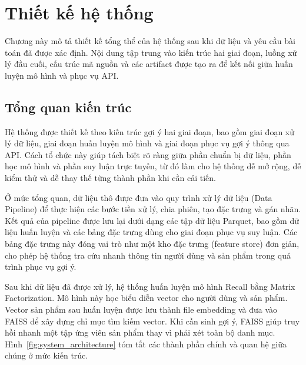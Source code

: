 ﻿\chapter{Thiết kế hệ thống}

Chương này mô tả thiết kế tổng thể của hệ thống sau khi dữ liệu và yêu cầu bài toán đã được xác định. Nội dung tập trung vào kiến trúc hai giai đoạn, luồng xử lý đầu cuối, cấu trúc mã nguồn và các artifact được tạo ra để kết nối giữa huấn luyện mô hình và phục vụ API.

\section{Tổng quan kiến trúc}
Hệ thống được thiết kế theo kiến trúc gợi ý hai giai đoạn, bao gồm giai đoạn xử lý dữ liệu, giai đoạn huấn luyện mô hình và giai đoạn phục vụ gợi ý thông qua API. Cách tổ chức này giúp tách biệt rõ ràng giữa phần chuẩn bị dữ liệu, phần học mô hình và phần suy luận trực tuyến, từ đó làm cho hệ thống dễ mở rộng, dễ kiểm thử và dễ thay thế từng thành phần khi cần cải tiến.
\medskip

Ở mức tổng quan, dữ liệu thô được đưa vào quy trình xử lý dữ liệu (Data Pipeline) để thực hiện các bước tiền xử lý, chia phiên, tạo đặc trưng và gán nhãn. Kết quả của pipeline được lưu lại dưới dạng các tập dữ liệu Parquet, bao gồm dữ liệu huấn luyện và các bảng đặc trưng dùng cho giai đoạn phục vụ suy luận. Các bảng đặc trưng này đóng vai trò như một kho đặc trưng (feature store) đơn giản, cho phép hệ thống tra cứu nhanh thông tin người dùng và sản phẩm trong quá trình phục vụ gợi ý.
\medskip

Sau khi dữ liệu đã được xử lý, hệ thống huấn luyện mô hình Recall bằng Matrix Factorization. Mô hình này học biểu diễn vector cho người dùng và sản phẩm. Vector sản phẩm sau huấn luyện được lưu thành file embedding và đưa vào FAISS để xây dựng chỉ mục tìm kiếm vector. Khi cần sinh gợi ý, FAISS giúp truy hồi nhanh một tập ứng viên sản phẩm thay vì phải xét toàn bộ danh mục. Hình~\ref{fig:system_architecture} tóm tắt các thành phần chính và quan hệ giữa chúng ở mức kiến trúc.

